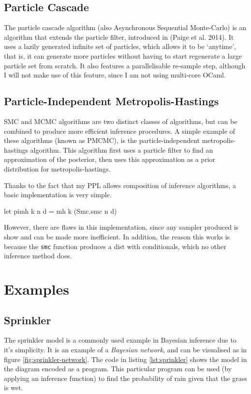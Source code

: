 \subsection{Particle Cascade} \label{sec:pc}
The particle cascade algorithm (also Asynchronous Sequential Monte-Carlo) is an algorithm that extends the particle filter, introduced in (Paige et al. 2014)\cite{paige2014asynchronous}. It uses a lazily generated infinite set of particles, which allows it to be `anytime', that is, it can generate more particles without having to start regenerate a large particle set from scratch. It also features a parallelisable re-sample step, although I will not make use of this feature, since I am not using multi-core OCaml.

\subsection{Particle-Independent Metropolis-Hastings} \label{sec:pimh}

SMC and MCMC algorithms are two distinct classes of algorithms, but can be combined to produce more efficient inference procedures. A simple example of these algorithms (known as PMCMC), is the particle-independent metropolis-hastings algorithm\cite{pmcmc}. This algorithm first uses a particle filter to find an approximation of the posterior, then uses this approximation as a prior distribution for metropolis-hastings.


Thanks to the fact that my PPL allows composition of inference algorithms, a basic implementation is very simple.
\begin{ocamlcode-in}
	let pimh k n d = mh k (Smc.smc n d)
\end{ocamlcode-in}

However, there are flaws in this implementation, since any sampler produced is show and can be made more inefficient.
In addition, the reason this works is because the \texttt{smc} function produces a dist with conditionals, which no other inference method does. 

\section{Examples}
	
\subsection{Sprinkler}
The sprinkler model is a commonly used example in Bayesian inference due to it's simplicity. It is an example of a \textit{Bayesian network}, and can be visualised as in figure \ref{fig:sprinkler-network}. The code in listing \ref{lst:sprinkler} shows the model in the diagram encoded as a program. This particular program can be used (by applying an inference function) to find the probability of rain given that the grass is wet.
	
